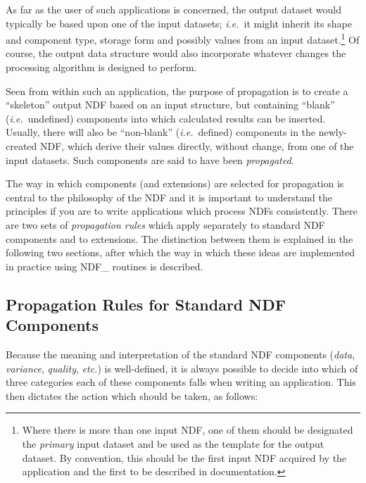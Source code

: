 \documentclass[twoside,11pt]{article}
\newcommand{\xlabel}[1]{}
\newcommand{\st}[1]{{\em{#1}}}
\begin{document}
As far as the user of such applications is concerned, the output dataset
would typically be based upon one of the input datasets; \st{i.e.}\ it might
inherit its shape and component type, storage form and possibly values from
an input dataset.\footnote{Where there is more than one input NDF, one of
them should be designated the \st{primary\/} input dataset and be used as the
template for the output dataset. By convention, this should be the first
input NDF acquired by the application and the first to be described in
documentation.} 
Of course, the output data structure would also incorporate whatever changes
the processing algorithm is designed to perform. 

Seen from within such an application, the purpose of propagation is to
create a ``skeleton'' output NDF based on an input structure, but containing
``blank'' (\st{i.e.}\ undefined) components into which calculated results
can be inserted. 
Usually, there will also be ``non-blank'' (\st{i.e.}\ defined) components
in the newly-created NDF, which derive their values directly, without
change, from one of the input datasets. 
Such components are said to have been \st{propagated}.

The way in which components (and extensions) are selected for propagation is
central to the philosophy of the NDF and it is important to understand the 
principles if you are to write applications which process NDFs consistently.
There are two sets of \st{propagation rules\/} which apply separately to
standard NDF components and to extensions. 
The distinction between them is explained in the following two sections,
after which the way in which these ideas are implemented in practice using 
NDF\_ routines is described. 

\subsection{\xlabel{propagation_rules_for_standard_ndf_components}\label{ss:propstandard}Propagation Rules for Standard NDF Components}

Because the meaning and interpretation of the standard NDF components
(\st{data}, \st{variance}, \st{quality}, \st{etc.}) is
well-defined, it is always 
possible to decide into which of three categories each of these components falls
when writing an application. 
This then dictates the action which should be taken, as follows:
\end{document}
